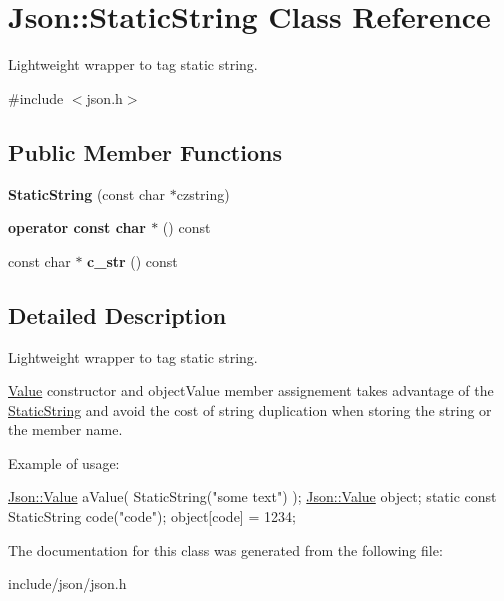 \hypertarget{class_json_1_1_static_string}{\section{Json\-:\-:Static\-String Class Reference}
\label{class_json_1_1_static_string}
}


Lightweight wrapper to tag static string.  




{\ttfamily \#include $<$json.\-h$>$}

\subsection*{Public Member Functions}
\begin{DoxyCompactItemize}
\item 
\hypertarget{class_json_1_1_static_string_afb6baf1ec078ce76f0b0f9b39d19437f}{{\bfseries Static\-String} (const char $\ast$czstring)}\label{class_json_1_1_static_string_afb6baf1ec078ce76f0b0f9b39d19437f}

\item 
\hypertarget{class_json_1_1_static_string_ac2b334d46bbea4c0227e508fc66433e9}{{\bfseries operator const char $\ast$} () const }\label{class_json_1_1_static_string_ac2b334d46bbea4c0227e508fc66433e9}

\item 
\hypertarget{class_json_1_1_static_string_ab86fc6a3183adf12fdba4b370acf1754}{const char $\ast$ {\bfseries c\-\_\-str} () const }\label{class_json_1_1_static_string_ab86fc6a3183adf12fdba4b370acf1754}

\end{DoxyCompactItemize}


\subsection{Detailed Description}
Lightweight wrapper to tag static string. 

\hyperlink{class_json_1_1_value}{Value} constructor and object\-Value member assignement takes advantage of the \hyperlink{class_json_1_1_static_string}{Static\-String} and avoid the cost of string duplication when storing the string or the member name.

Example of usage\-: 
\begin{DoxyCode}
\hyperlink{class_json_1_1_value}{Json::Value} aValue( StaticString(\textcolor{stringliteral}{"some text"}) );
\hyperlink{class_json_1_1_value}{Json::Value} object;
\textcolor{keyword}{static} \textcolor{keyword}{const} StaticString code(\textcolor{stringliteral}{"code"});
\textcolor{keywordtype}{object}[code] = 1234;
\end{DoxyCode}
 

The documentation for this class was generated from the following file\-:\begin{DoxyCompactItemize}
\item 
include/json/json.\-h\end{DoxyCompactItemize}
